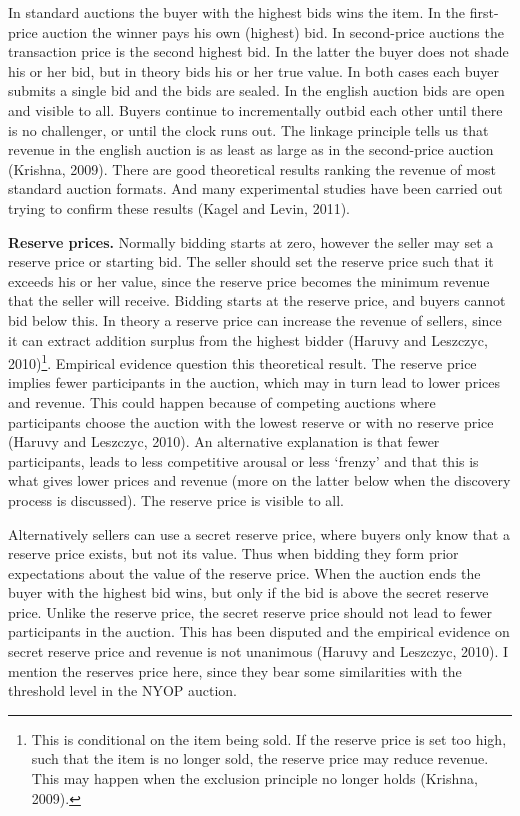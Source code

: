 \documentclass[a4paper,12pt]{article}
\begin{document}
	In standard auctions the buyer with the highest bids wins the item. In the first-price auction the winner pays his own (highest) bid. In second-price auctions the transaction price is the second highest bid. In the latter the buyer does not shade his or her bid, but in theory bids his or her true value. In both cases each buyer submits a single bid and the bids are sealed. In the english auction bids are open and visible to all. Buyers continue to incrementally outbid each other until there is no challenger, or until the clock runs out. The linkage principle tells us that revenue in the english auction is as least as large as in the second-price auction (Krishna, 2009). There are good theoretical results ranking the revenue of most standard auction formats. And many experimental studies have been carried out trying to confirm these results (Kagel and Levin, 2011). 

	{\bf Reserve prices.} Normally bidding starts at zero, however the seller may set a reserve price or starting bid. The seller should set the reserve price such that it exceeds his or her value, since the reserve price becomes the minimum revenue that the seller will receive. Bidding starts at the reserve price, and buyers cannot bid below this. In theory a reserve price can increase the revenue of sellers, since it can extract addition surplus from the highest bidder (Haruvy and Leszczyc, 2010)\footnote{This is conditional on the item being sold. If the reserve price is set too high, such that the item is no longer sold, the reserve price may reduce revenue. This may happen when the exclusion principle no longer holds (Krishna, 2009).}. Empirical evidence question this theoretical result. The reserve price implies fewer participants in the auction, which may in turn lead to lower prices and revenue. This could happen because of competing auctions where participants choose the auction with the lowest reserve or with no reserve price (Haruvy and Leszczyc, 2010). An alternative explanation is that fewer participants, leads to less competitive arousal or less `frenzy' and that this is what gives lower prices and revenue (more on the latter below when the discovery process is discussed). The reserve price is visible to all. 

	Alternatively sellers can use a secret reserve price, where buyers only know that a reserve price exists, but not its value. Thus when bidding they form prior expectations about the value of the reserve price. When the auction ends the buyer with the highest bid wins, but only if the bid is above the secret reserve price. Unlike the reserve price, the secret reserve price should not lead to fewer participants in the auction. This has been disputed and the empirical evidence on secret reserve price and revenue is not unanimous (Haruvy and Leszczyc, 2010). I mention the reserves price here, since they bear some similarities with the threshold level in the NYOP auction.
\end{document}
